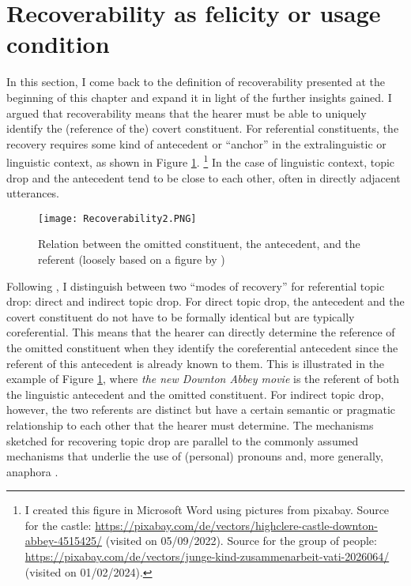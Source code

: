 \section{Recoverability as felicity or usage condition}\label{sec:recover.summ}
In this section, I come back to the definition of recoverability presented at the beginning of this chapter and expand it in light of the further insights gained.
I argued that recoverability means that the hearer must be able to uniquely identify the (reference of the) covert constituent.
For referential constituents, the recovery requires some kind of antecedent or ``anchor'' in the extralinguistic or linguistic context, as shown in Figure \ref{fig:recoverability}.%
\footnote{I created this figure in Microsoft Word using pictures from pixabay. Source for the castle: \url{https://pixabay.com/de/vectors/highclere-castle-downton-abbey-4515425/} (visited on 05/09/2022). Source for the group of people: \url{https://pixabay.com/de/vectors/junge-kind-zusammenarbeit-vati-2026064/} (visited on 01/02/2024).}
%
In the case of linguistic context, topic drop and the antecedent tend to be close to each other, often in directly adjacent utterances.

\begin{figure}
\centering
\texttt{[image: Recoverability2.PNG]}
\caption{Relation between the omitted constituent, the antecedent, and the referent (loosely based on a figure by \cite[76]{helmer2016})}
\label{fig:recoverability}
\end{figure}

\noindent
Following \citet{helmer2016}, I distinguish between two ``modes of recovery'' for referential topic drop: direct and indirect topic drop.
For direct topic drop, the antecedent and the covert constituent do not have to be formally identical but  are typically coreferential.
This means that the hearer can directly determine the reference of the omitted constituent when they identify the coreferential antecedent since the referent of this antecedent is already known to them.
This is illustrated in the example of Figure \ref{fig:recoverability}, where \textit{the new Downton Abbey movie} is the referent of both the linguistic antecedent and the omitted constituent.
For indirect topic drop, however, the two referents are distinct but have a certain semantic or pragmatic relationship to each other that the hearer must determine.
The mechanisms sketched for recovering topic drop are parallel to the commonly assumed mechanisms that underlie the use of (personal) pronouns and, more generally, anaphora \citep[see, e.g.,][]{huang2000,bhat2004}.

